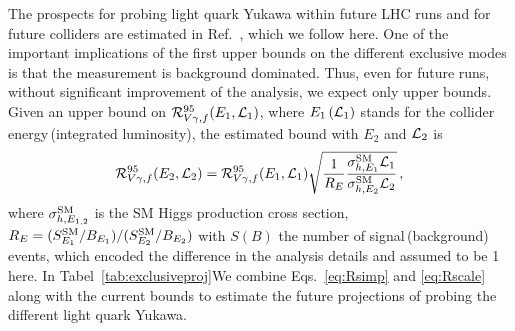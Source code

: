 \documentclass[../report.tex]{subfiles}
\newcommand{\cR}{\mathcal{R}}
\begin{document}
The prospects for probing light quark Yukawa within future LHC runs and for future colliders are estimated in Ref.~\cite{Perez:2015lra}, which we follow here. 
One of the important implications of the first upper bounds on the different exclusive modes is that the measurement is background dominated. Thus, even for future runs, without significant improvement of the analysis, we expect only upper bounds.  
Given an upper bound on $\cR^{95}_{V\gamma,f}(E_1,\cL_1)$, where $E_1\,(\mathcal{L}_1)$ stands for the collider energy\,(integrated luminosity), the estimated bound with $E_2$ and $\mathcal{L}_2$ is
%
\begin{align}
	\label{eq:Rscale}
	\cR^{95}_{V\gamma,f}(E_2,\cL_2)
=	\cR^{95}_{V\gamma,f}(E_1,\cL_1) \sqrt{ \frac{1}{R_E} \frac{\sigma^{\rm SM}_{h,E_1} \cL_1  }{\sigma^{\rm SM}_{h,E_2} \cL_2} } \, ,
\end{align}
%
where $\sigma^{\rm SM}_{h,E_{1,2}}$ is the SM Higgs production cross section, $R_{E} = (S_{E_1}^{\rm SM}/B_{E_1})/(S_{E_2}^{\rm SM}/B_{E_2})$ with $S(B)$ the number of signal\,(background) events, which encoded the difference in the analysis details and assumed to be 1 here. 
In Tabel~\ref{tab:exclusiveproj}We combine Eqs.~\eqref{eq:Rsimp} and \eqref{eq:Rscale} along with the current bounds to estimate the future projections of probing the different light quark Yukawa. 
\end{document}
